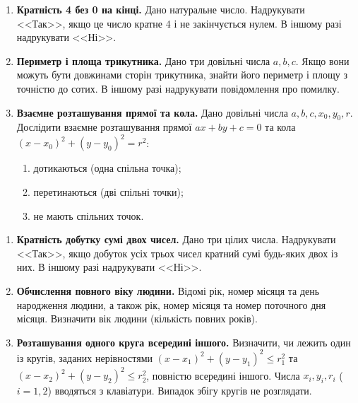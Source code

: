 	\vspace{2cm}
	
	
	{\large
		\begin{enumerate}
			\item \textbf{Кратність 4 без 0 на кінці.} Дано натуральне число. Надрукувати <<Так>>, якщо це число кратне 4 і не закінчується нулем. В іншому разі надрукувати <<Ні>>.
			\item \textbf{Периметр і площа трикутника.} Дано три довільні числа $a, b, c$. Якщо вони можуть бути довжинами сторін трикутника, знайти його периметр і площу з точністю до сотих. В іншому разі надрукувати повідомлення про помилку.
			\item \textbf{Взаємне розташування прямої та кола.} Дано довільні числа $a, b, c, x_0, y_0, r$. Дослідити взаємне розташування прямої $ax + by + c = 0$ та кола $(x - x_0)^2 + (y - y_0)^2 = r^2$:
			\begin{enumerate}[label=\alph*)]
				\item дотикаються (одна спільна точка);
				\item перетинаються (дві спільні точки);
				\item не мають спільних точок.
			\end{enumerate}
		\end{enumerate}
	}
	
	
	
	
	{\large
		\begin{enumerate}
			\item \textbf{Кратність добутку сумі двох чисел.} Дано три цілих числа. Надрукувати <<Так>>, якщо добуток усіх трьох чисел кратний сумі будь-яких двох із них. В іншому разі надрукувати <<Ні>>.
			\item \textbf{Обчислення повного віку людини.} Відомі рік, номер місяця та день народження людини, а також рік, номер місяця та номер поточного дня місяця. Визначити вік людини (кількість повних років).
			\item \textbf{Розташування одного круга всередині іншого.} Визначити, чи лежить один із кругів, заданих нерівностями $(x - x_1)^2 + (y - y_1)^2 \leqslant r_1^2$ та $(x - x_2)^2 + (y - y_2)^2 \leqslant r_2^2$, повністю всередині іншого. Числа $x_i, y_i, r_i$ ($i = 1, 2$) вводяться з клавіатури. Випадок збігу кругів не розглядати.
		\end{enumerate}
	}
	
	
	\vspace{2cm}
	
